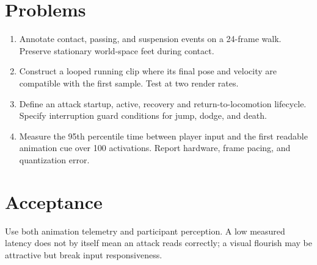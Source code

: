 \documentclass[10pt,letterpaper]{article}
\begin{document}
\makedoctitle
\makedocsummary

\section{Problems}
\begin{enumerate}
\item Annotate contact, passing, and suspension events on a 24-frame walk. Preserve stationary world-space feet during contact.
\item Construct a looped running clip where its final pose and velocity are compatible with the first sample. Test at two render rates.
\item Define an attack startup, active, recovery and return-to-locomotion lifecycle. Specify interruption guard conditions for jump, dodge, and death.
\item Measure the 95th percentile time between player input and the first readable animation cue over 100 activations. Report hardware, frame pacing, and quantization error.
\end{enumerate}
\section{Acceptance}
Use both animation telemetry and participant perception. A low measured latency does not by itself mean an attack reads correctly; a visual flourish may be attractive but break input responsiveness.
\end{document}
